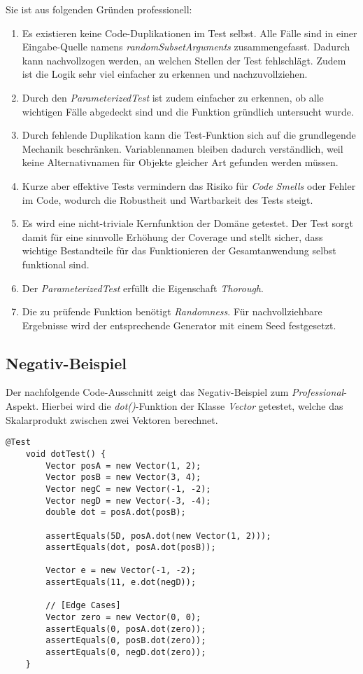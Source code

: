 Sie ist aus folgenden Gründen professionell:
\begin{enumerate}
    \item Es existieren keine Code-Duplikationen im Test selbst.
    Alle Fälle sind in einer Eingabe-Quelle namens
    \textit{randomSubsetArguments} zusammengefasst. Dadurch kann
    nachvollzogen werden, an welchen Stellen der Test fehlschlägt.
    Zudem ist die Logik sehr viel einfacher zu erkennen und
    nachzuvollziehen.
    \item Durch den \textit{ParameterizedTest} ist zudem einfacher zu
    erkennen, ob alle wichtigen Fälle abgedeckt sind und die Funktion
    gründlich untersucht wurde.
    \item Durch fehlende Duplikation kann die Test-Funktion sich auf
    die grundlegende Mechanik beschränken. Variablennamen bleiben
    dadurch verständlich, weil keine Alternativnamen für Objekte
    gleicher Art gefunden werden müssen.
    \item Kurze aber effektive Tests vermindern das Risiko für
    \textit{Code Smells} oder Fehler im Code, wodurch die Robustheit
    und Wartbarkeit des Tests steigt.
    \item Es wird eine nicht-triviale Kernfunktion der Domäne getestet.
    Der Test sorgt damit für eine sinnvolle Erhöhung der Coverage und
    stellt sicher, dass wichtige Bestandteile für das Funktionieren
    der Gesamtanwendung selbst funktional sind.
    \item Der \textit{ParameterizedTest} erfüllt die Eigenschaft
    \textit{Thorough}.
    \item Die zu prüfende Funktion benötigt \textit{Randomness}. Für
    nachvollziehbare Ergebnisse wird der entsprechende Generator mit
    einem Seed festgesetzt.
\end{enumerate}

\subsection*{Negativ-Beispiel}
Der nachfolgende Code-Ausschnitt zeigt das Negativ-Beispiel zum
\textit{Professional}-Aspekt. Hierbei wird die
\textit{dot()}-Funktion der Klasse
\textit{Vector} getestet, welche das Skalarprodukt zwischen zwei
Vektoren berechnet.

\vspace{0.5cm}
\begin{lstlisting}[caption={ATRIP: Professional / Negativ}]
    @Test
    void dotTest() {
        Vector posA = new Vector(1, 2);
        Vector posB = new Vector(3, 4);
        Vector negC = new Vector(-1, -2);
        Vector negD = new Vector(-3, -4);
        double dot = posA.dot(posB);
        
        assertEquals(5D, posA.dot(new Vector(1, 2)));
        assertEquals(dot, posA.dot(posB));
        
        Vector e = new Vector(-1, -2);
        assertEquals(11, e.dot(negD));
        
        // [Edge Cases]
        Vector zero = new Vector(0, 0);
        assertEquals(0, posA.dot(zero));
        assertEquals(0, posB.dot(zero));
        assertEquals(0, negD.dot(zero));
    }
\end{lstlisting}

